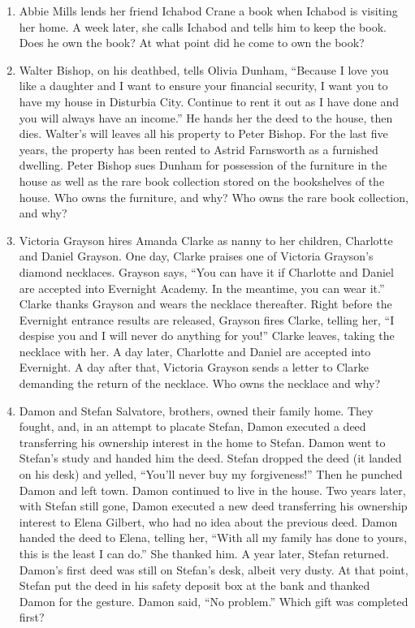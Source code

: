\begin{enumerate}
\item Abbie Mills lends her friend Ichabod Crane a book when Ichabod is visiting
her home.  A week later, she calls Ichabod and tells him to keep the book. 
Does he own the book?  At what point did he come to own the book?

\item Walter Bishop, on his deathbed, tells Olivia Dunham, ``Because I love you
like a daughter and I want to ensure your financial security, I want you to
have my house in Disturbia City.  Continue to rent it out as I have done and
you will always have an income.''  He hands her the deed to the house, then
dies.  Walter's will leaves all his property to Peter Bishop.  For the last
five years, the property has been rented to Astrid Farnsworth as a furnished
dwelling.  Peter Bishop sues Dunham for possession of the furniture in the
house as well as the rare book collection stored on the bookshelves of the
house.  Who owns the furniture, and why?  Who owns the rare book collection,
and why?


\item Victoria Grayson hires Amanda Clarke as nanny to her children, Charlotte
and Daniel Grayson.  One day, Clarke praises one of Victoria Grayson's diamond
necklaces.  Grayson says, ``You can have it if Charlotte and Daniel are
accepted into Evernight Academy.  In the meantime, you can wear it.''  Clarke
thanks Grayson and wears the necklace thereafter.  Right before the Evernight
entrance results are released, Grayson fires Clarke, telling her, ``I despise
you and I will never do anything for you!''  Clarke leaves, taking the necklace
with her.  A day later, Charlotte and Daniel are accepted into Evernight.  A
day after that, Victoria Grayson sends a letter to Clarke demanding the return
of the necklace.  Who owns the necklace and why?


\item Damon and Stefan Salvatore, brothers, owned their family home.  They
fought, and, in an attempt to placate Stefan, Damon executed a deed
transferring his ownership interest in the home to Stefan.  Damon went to
Stefan's study and handed him the deed.  Stefan dropped the deed (it landed on
his desk) and yelled, ``You'll never buy my forgiveness!'' Then he punched
Damon and left town.  Damon continued to live in the house.  Two years later,
with Stefan still gone, Damon executed a new deed transferring his ownership
interest to Elena Gilbert, who had no idea about the previous deed.  Damon
handed the deed to Elena, telling her, ``With all my family has done to yours,
this is the least I can do.''  She thanked him.  A year later, Stefan returned.
 Damon's first deed was still on Stefan's desk, albeit very dusty.  At that
point, Stefan put the deed in his safety deposit box at the bank and thanked
Damon for the gesture.  Damon said, ``No problem.''  Which gift was completed
first?



\end{enumerate}
